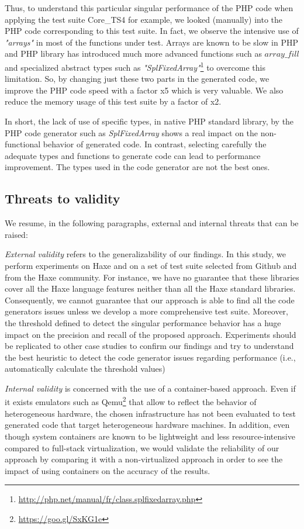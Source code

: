 Thus, to understand this particular singular performance of the PHP code when applying the test suite Core\_TS4 for example, we looked (manually) into the PHP code corresponding to this test suite. In fact, we observe the intensive use of \textit{"arrays"} in most of the functions under test. Arrays are known to be slow in PHP and PHP library has introduced much more advanced functions such as $array\_fill$ and specialized abstract types such as \textit{"SplFixedArray"}\footnote{\url{http://php.net/manual/fr/class.splfixedarray.php}} to overcome this limitation. So, by changing just these two parts in the generated code, we improve the PHP code speed with a factor x5 which is very valuable. We also reduce the memory usage of this test suite by a factor of x2.

In short, the lack of use of specific types, in native PHP standard library, by the PHP code generator such as \textit{SplFixedArray} shows a real impact on the non-functional behavior of generated code. In contrast, selecting carefully the adequate types and functions to generate code can lead to performance improvement. The types used in the code generator are not the best ones. 

\subsection{Threats to validity}
We resume, in the following paragraphs, external and internal threats that can be raised:

\textit{External validity} refers to the generalizability of our findings. In this study, we perform experiments on Haxe and on a set of test suite selected from Github and from the Haxe community. For instance, we have no guarantee that these libraries cover all the Haxe language features neither than all the Haxe standard libraries. Consequently, we cannot guarantee that our approach is able to find all the code generators issues unless we develop a more comprehensive test suite. Moreover, the threshold defined to detect the singular performance behavior has a huge impact on the precision and recall of the proposed approach. Experiments should be replicated to other case studies to confirm our findings and try to understand the best heuristic to detect the code generator issues regarding performance (i.e., automatically calculate the threshold values)

\textit{Internal validity} is concerned with the use of a container-based approach. Even if it exists emulators such as Qemu\footnote{\url{https://goo.gl/SxKG1e}} that allow to reflect the behavior of heterogeneous hardware, the chosen infrastructure has not been evaluated to test generated code that target heterogeneous hardware machines. In addition, even though system containers are known to be lightweight and less resource-intensive compared to full-stack virtualization, we would validate the reliability of our approach by comparing it with a non-virtualized approach in order to see the impact of using containers on the accuracy of the results.



